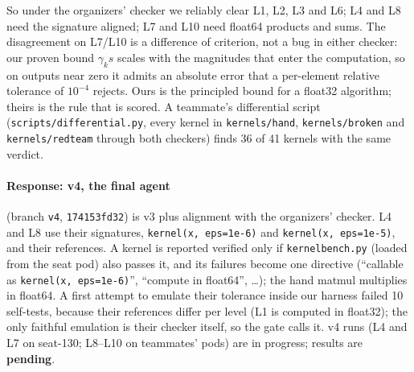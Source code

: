 \documentclass[11pt]{article}
\newcommand{\code}[1]{\texttt{#1}}
\begin{document}
So under the organizers' checker we reliably clear L1, L2, L3 and L6; L4 and L8 need the signature
aligned; L7 and L10 need float64 products and sums. The disagreement on L7/L10 is a difference of criterion,
not a bug in either checker: our proven bound $\gamma_k s$ scales with the magnitudes that enter the
computation, so on outputs near zero it admits an absolute error that a per-element relative tolerance
of $10^{-4}$ rejects. Ours is the principled bound for a float32 algorithm; theirs is the rule that is
scored. A teammate's differential script (\code{scripts/differential.py}, every kernel in
\code{kernels/hand}, \code{kernels/broken} and \code{kernels/redteam} through both checkers) finds 36 of 41 kernels with the same
verdict.

\paragraph{Response: v4, the final agent} (branch \code{v4}, \code{174153fd32}) is v3 plus alignment with the
organizers' checker. L4 and L8 use their signatures, \code{kernel(x, eps=1e-6)} and
\code{kernel(x, eps=1e-5)}, and their references. A kernel is reported verified only if
\code{kernelbench.py} (loaded from the seat pod) also passes it, and its failures become one directive
(``callable as \code{kernel(x, eps=1e-6)}'', ``compute in float64'', \dots); the hand matmul multiplies in
float64. A first attempt to emulate their tolerance inside our harness failed 10 self-tests, because
their references differ per level (L1 is computed in float32); the only faithful emulation is their
checker itself, so the gate calls it. v4 runs (L4 and L7 on seat-130; L8--L10 on teammates' pods) are in
progress; results are \textbf{pending}.

\end{document}
